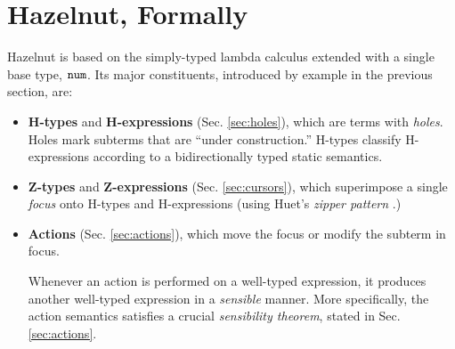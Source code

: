 \documentclass{llncs}
\begin{document}



\section{Hazelnut, Formally}
\label{sec:hazel}
Hazelnut is based on the simply-typed lambda calculus extended with a single base type, $\texttt{num}$. Its major constituents, introduced by example in the previous section, are:
\begin{itemize}
\item \textbf{H-types} and \textbf{H-expressions} (Sec. \ref{sec:holes}), which are terms with \emph{holes}. Holes mark subterms that are ``under construction.'' H-types classify H-expressions according to a {bidirectionally typed} static semantics.
\item \textbf{Z-types} and \textbf{Z-expressions} (Sec. \ref{sec:cursors}), which superimpose a single \emph{focus} onto H-types and H-expressions (using Huet's \emph{zipper pattern} \cite{JFP::Huet1997}.)
\item \textbf{Actions} (Sec. \ref{sec:actions}), which move the focus or modify the subterm in focus.

Whenever an action is performed on a well-typed expression, it produces another well-typed expression in a \emph{sensible} manner. More specifically, the action semantics satisfies a crucial \emph{sensibility theorem}, stated in Sec. \ref{sec:actions}.
\end{itemize}
\end{document}
